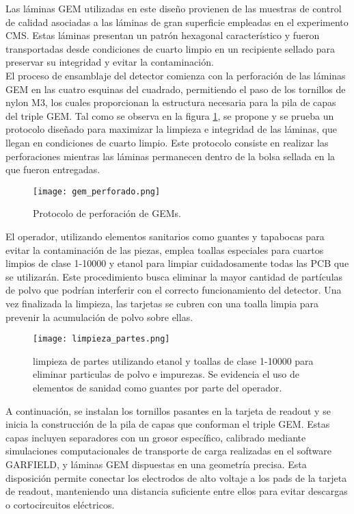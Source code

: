 \documentclass{report}
\begin{document}
\noindent Las láminas GEM utilizadas en este diseño provienen de las muestras de control de calidad asociadas a las láminas de gran superficie empleadas en el experimento CMS. Estas láminas presentan un patrón hexagonal característico y fueron transportadas desde condiciones de cuarto limpio en un recipiente sellado para preservar su integridad y evitar la contaminación.\\

\noindent El proceso de ensamblaje del detector comienza con la perforación de las láminas GEM en las cuatro esquinas del cuadrado, permitiendo el paso de los tornillos de nylon M3, los cuales proporcionan la estructura necesaria para la pila de capas del triple GEM. Tal como se observa en la figura \ref{fig:gem_perforado}, se propone y se prueba un protocolo diseñado para maximizar la limpieza e integridad de las láminas, que llegan en condiciones de cuarto limpio. Este protocolo consiste en realizar las perforaciones mientras las láminas permanecen dentro de la bolsa sellada en la que fueron entregadas.\\

\begin{figure}[H]
    \centering
    \texttt{[image: gem\_perforado.png]}
    \caption{Protocolo de perforación de GEMs.}
    \label{fig:gem_perforado}
\end{figure}

\noindent El operador, utilizando elementos sanitarios como guantes y tapabocas para evitar la contaminación de las piezas, emplea toallas especiales para cuartos limpios de clase 1-10000 y etanol para limpiar cuidadosamente todas las PCB que se utilizarán. Este procedimiento busca eliminar la mayor cantidad de partículas de polvo que podrían interferir con el correcto funcionamiento del detector. Una vez finalizada la limpieza, las tarjetas se cubren con una toalla limpia para prevenir la acumulación de polvo sobre ellas.\\

\begin{figure}[H]
    \centering
    \texttt{[image: limpieza\_partes.png]}
    \caption{limpieza de partes utilizando etanol y toallas de clase 1-10000 para eliminar particulas de polvo e impurezas. Se evidencia el uso de elementos de sanidad como guantes por parte del operador.}
    \label{fig:limpieza}
\end{figure}

\noindent A continuación, se instalan los tornillos pasantes en la tarjeta de readout y se inicia la construcción de la pila de capas que conforman el triple GEM. Estas capas incluyen separadores con un grosor específico, calibrado mediante simulaciones computacionales de transporte de carga realizadas en el software GARFIELD, y láminas GEM dispuestas en una geometría precisa. Esta disposición permite conectar los electrodos de alto voltaje a los pads de la tarjeta de readout, manteniendo una distancia suficiente entre ellos para evitar descargas o cortocircuitos eléctricos.\\
\end{document}

